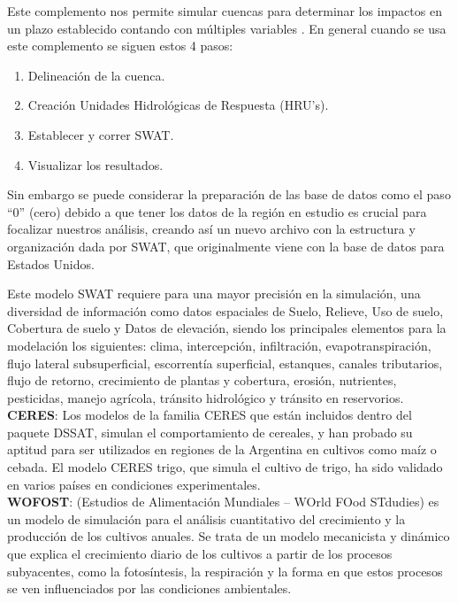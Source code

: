 Este complemento nos permite simular cuencas para determinar los impactos en un plazo establecido contando con múltiples variables . En general cuando se usa este complemento se siguen estos 4 pasos:
\begin{enumerate}
	\item Delineación de la cuenca.
	\item Creación Unidades Hidrológicas de Respuesta (HRU’s).
	\item Establecer y correr SWAT.
	\item Visualizar los resultados.
\end{enumerate}
Sin embargo se puede considerar la preparación de las base de datos como el paso “0” (cero) debido a que tener los datos de la región en estudio es crucial para focalizar nuestros análisis, creando así un nuevo archivo con la estructura y organización dada por SWAT, que originalmente viene con la base de datos para Estados Unidos.

Este modelo SWAT requiere para una mayor precisión en la simulación, una diversidad de información como datos espaciales de Suelo, Relieve, Uso de suelo, Cobertura de suelo y Datos de elevación, siendo los principales elementos para la modelación los siguientes: clima, intercepción, infiltración, evapotranspiración, flujo lateral subsuperficial, escorrentía superficial, estanques, canales tributarios, flujo de retorno, crecimiento de plantas y cobertura, erosión, nutrientes, pesticidas, manejo agrícola, tránsito hidrológico y tránsito en reservorios. \parencite{noauthor_conoce_nodate}\\

\textbf{CERES}: Los modelos de la familia CERES que están incluidos dentro del paquete DSSAT, simulan el comportamiento de cereales, y han probado su aptitud para ser utilizados en regiones de la Argentina en cultivos como maíz o cebada. El modelo CERES trigo, que simula el cultivo de trigo, ha sido validado en varios países en condiciones experimentales.\parencite{salvagiotti2003modelo}\\

\textbf{WOFOST}: (Estudios de Alimentación Mundiales – WOrld FOod STdudies) es un modelo de simulación para el análisis cuantitativo del crecimiento y la producción de los cultivos anuales.
Se trata de un modelo mecanicista y dinámico que explica el crecimiento diario de los cultivos a partir de los procesos subyacentes, como la fotosíntesis, la respiración y la forma en que estos procesos se ven influenciados por las condiciones ambientales.

